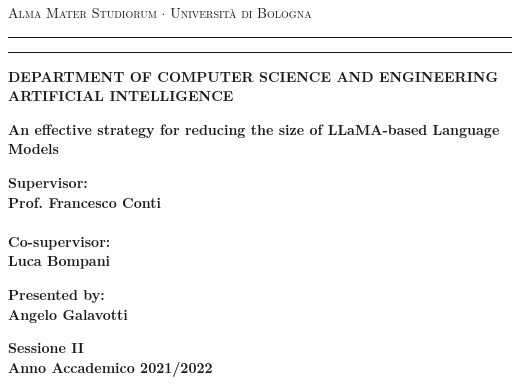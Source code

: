 \documentclass[12pt,a4paper,openright,twoside]{report}
\begin{document}
\begin{titlepage}
	\begin{center}
		{{\Large{\textsc{Alma Mater Studiorum $\cdot$ Università di
							Bologna}}}} \rule[0.1cm]{15.8cm}{0.1mm}
		\rule[0.5cm]{15.8cm}{0.6mm}
		{\small{\bf DEPARTMENT OF COMPUTER SCIENCE
		AND ENGINEERING\\
		ARTIFICIAL INTELLIGENCE }}
	\end{center}
	\vspace{15mm}
	\begin{center}
		{\LARGE{\bf An effective strategy for reducing the size of LLaMA-based Language Models}}\\
		\vspace{3mm}
	\end{center}
	\vspace{40mm}
	\par
	\noindent
	\begin{minipage}[t]{0.47\textwidth}
		{\large{\bf Supervisor:\\
				Prof. Francesco Conti\\\\
				Co-supervisor:\\
				Luca Bompani}}
	\end{minipage}
	\hfill
	\begin{minipage}[t]{0.47\textwidth}\raggedleft
		{\large{\bf Presented by:\\
				Angelo Galavotti}}
	\end{minipage}
	\vspace{20mm}
	\begin{center}
		{\large{\bf Sessione II\\
				Anno Accademico 2021/2022}}
	\end{center}
\end{titlepage}
\end{document}
